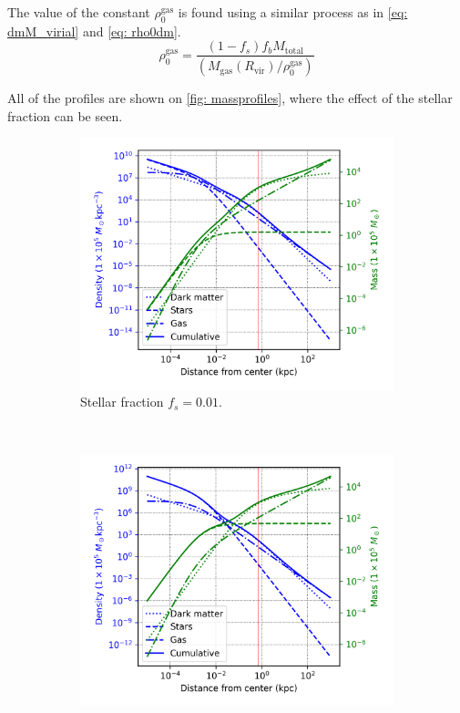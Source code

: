 		The value of the constant $\rho_0^\text{gas}$ is found using a similar process as in \autoref{eq: dmM_virial} and \ref{eq: rho0dm}.
		\begin{equation}
			\rho_0^\text{gas} = \dfrac{(1 - f_s) f_bM_\text{total}}{(M_\text{gas}(R_\text{vir}) / \rho_0^\text{gas})}
		\end{equation}
		
		All of the profiles are shown on \autoref{fig: massprofiles}, where the effect of the stellar fraction can be seen.
		
		\begin{figure}[h]
			\centering
			\begin{subfigure}[b]{0.49\textwidth}
				\includegraphics[width=\textwidth]{"../Files/Week 6/density_mass_fs01"}
				\caption{Stellar fraction $f_s = 0.01$.}
				\label{fig: baryonicprofilehigh}
			\end{subfigure}
			~ 
			\begin{subfigure}[b]{0.49\textwidth}
				\includegraphics[width=\textwidth]{"../Files/Week 6/density_mass_fs3"}

\end{subfigure}
\end{figure}
